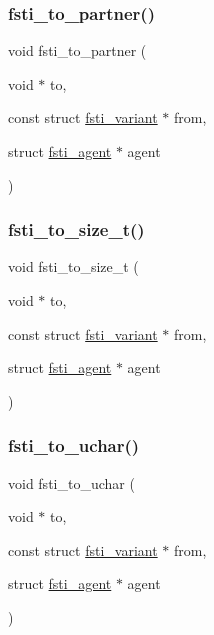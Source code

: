 \mbox{\label{fsti-events_8h_aad5bd92a57743b08d6c9eb5bac33c78b}} 
\subsubsection{\texorpdfstring{fsti\+\_\+to\+\_\+partner()}{fsti\_to\_partner()}}
{\footnotesize\ttfamily void fsti\+\_\+to\+\_\+partner (\begin{DoxyParamCaption}\item[{void $\ast$}]{to,  }\item[{const struct \mbox{\hyperlink{structfsti__variant}{fsti\+\_\+variant}} $\ast$}]{from,  }\item[{struct \mbox{\hyperlink{structfsti__agent}{fsti\+\_\+agent}} $\ast$}]{agent }\end{DoxyParamCaption})}

\mbox{\label{fsti-events_8h_ace7211e8e83bb5273066bc5fe50585a6}} 
\subsubsection{\texorpdfstring{fsti\+\_\+to\+\_\+size\+\_\+t()}{fsti\_to\_size\_t()}}
{\footnotesize\ttfamily void fsti\+\_\+to\+\_\+size\+\_\+t (\begin{DoxyParamCaption}\item[{void $\ast$}]{to,  }\item[{const struct \mbox{\hyperlink{structfsti__variant}{fsti\+\_\+variant}} $\ast$}]{from,  }\item[{struct \mbox{\hyperlink{structfsti__agent}{fsti\+\_\+agent}} $\ast$}]{agent }\end{DoxyParamCaption})}

\mbox{\label{fsti-events_8h_aad3a0605b88803863e016f9409df45ba}} 
\subsubsection{\texorpdfstring{fsti\+\_\+to\+\_\+uchar()}{fsti\_to\_uchar()}}
{\footnotesize\ttfamily void fsti\+\_\+to\+\_\+uchar (\begin{DoxyParamCaption}\item[{void $\ast$}]{to,  }\item[{const struct \mbox{\hyperlink{structfsti__variant}{fsti\+\_\+variant}} $\ast$}]{from,  }\item[{struct \mbox{\hyperlink{structfsti__agent}{fsti\+\_\+agent}} $\ast$}]{agent }\end{DoxyParamCaption})}

